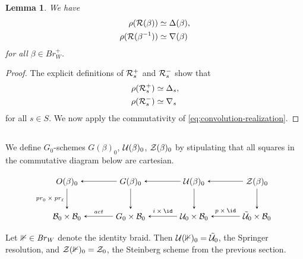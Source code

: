 \documentclass[a4paper,10pt,leqno]{amsart}
\theoremstyle{plain}
\theoremstyle{plain}
\theoremstyle{plain}
\newtheorem{lem}[thm]{Lemma}
\theoremstyle{definition}
\theoremstyle{remark}
\newcommand{\Br}{\mathit{Br}}
\newcommand{\act}{\mathit{act}}
\renewcommand{\pr}{\mathit{pr}}
\begin{document}
\begin{lem}\label{lem:realization-rouquier}
We have
\begin{align}
\rho(\cal{R}(\beta)) 
	&\simeq \Delta(\beta),\\
\rho(\cal{R}(\beta^{-1}))
	&\simeq \nabla(\beta)
\end{align}
for all $\beta \in \Br_W^+$.
\end{lem}

\begin{proof}
The explicit definitions of $\cal{R}_s^+$ and $\cal{R}_s^-$ show that
\begin{align}
\rho(\cal{R}_s^+) &\simeq \Delta_s,\\
\rho(\cal{R}_s^-) &\simeq \nabla_s
\end{align}
for all $s \in S$.
We now apply the commutativity of \eqref{eq:convolution-realization}.
\end{proof}

\subsection{}

We define $G_0$-schemes $G(\beta)_0$, $\cal{U}(\beta)_0$, $\cal{Z}(\beta)_0$ by stipulating that all squares in the commutative diagram below are cartesian.
\begin{equation}
\begin{tikzpicture}[baseline=(current bounding box.center), >=stealth]
\matrix(m)[matrix of math nodes, row sep=2.5em, column sep=3.5em, text height=2ex, text depth=0.5ex]
{	O(\beta)_0
		&G(\beta)_0
		&\cal{U}(\beta)_0
		&\cal{Z}(\beta)_0\\
	\cal{B}_0 \times \cal{B}_0
		&G_0 \times \cal{B}_0
		&\cal{U}_0 \times \cal{B}_0
		&\tilde{\cal{U}}_0 \times \cal{B}_0\\
		};
\path[->,font=\scriptsize, auto]
(m-1-2)		edge (m-1-1)
(m-1-3) 	edge (m-1-2)
(m-1-4) 	edge (m-1-3)
(m-1-1)		edge node[left]{$\pr_0 \times \pr_\ell$} (m-2-1)
(m-1-2)		edge (m-2-2)
(m-1-3) 	edge (m-2-3)			
(m-1-4) 	edge (m-2-4)
(m-2-2)		edge node[above]{$\act$} (m-2-1)
(m-2-3)		edge node[above]{$i \times \id$} (m-2-2)
(m-2-4)		edge node[above]{$p \times \id$} (m-2-3);
\end{tikzpicture}
\end{equation}
Let $\bb{1} \in \Br_W$ denote the identity braid.
Then $\cal{U}(\bb{1})_0 = \tilde{\cal{U}}_0$, the Springer resolution, and $\cal{Z}(\bb{1})_0 = \cal{Z}_0$, the Steinberg scheme from the previous section.
\end{document}

